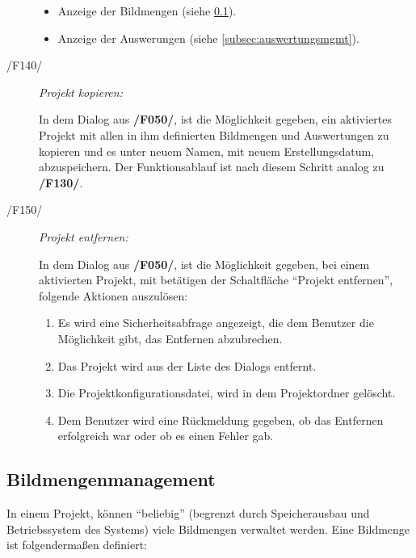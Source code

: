 \begin{description}
\begin{itemize}
				\item Anzeige der Bildmengen (siehe \ref{subsec:bildmengenmgmt}).
				
				\item Anzeige der Auswerungen (siehe \ref{subsec:auswertungsmgmt}).
			
			\end{itemize}		
		
		\item[/F140/] \textit{Projekt kopieren:}\par In dem Dialog aus \textbf{/F050/}, ist die Möglichkeit gegeben, ein aktiviertes Projekt mit allen in ihm definierten Bildmengen und Auswertungen zu kopieren und es unter neuem Namen, mit neuem Erstellungsdatum, abzuspeichern. Der Funktionsablauf ist nach diesem Schritt analog zu \textbf{/F130/}.
		
		\item[/F150/] \textit{Projekt entfernen:}\par In dem Dialog aus \textbf{/F050/}, ist die Möglichkeit gegeben, bei einem aktivierten Projekt, mit betätigen der Schaltfläche "`Projekt entfernen"', folgende Aktionen auszulösen:
			
			\begin{enumerate}
				
				\item Es wird eine Sicherheitsabfrage angezeigt, die dem Benutzer die Möglichkeit gibt, das Entfernen abzubrechen.
				
				\item Das Projekt wird aus der Liste des Dialogs entfernt.
				
				\item Die Projektkonfigurationsdatei, wird in dem Projektordner gelöscht.
				
				\item Dem Benutzer wird eine Rückmeldung gegeben, ob das Entfernen erfolgreich war oder ob es einen Fehler gab.
			
			\end{enumerate}
	
	\end{description}

\subsection{Bildmengenmanagement}

\label{subsec:bildmengenmgmt}
	
	In einem Projekt, können "`beliebig"' (begrenzt durch Speicherausbau und Betriebssystem des Systems) viele Bildmengen verwaltet werden. Eine Bildmenge ist folgendermaßen definiert:
	
